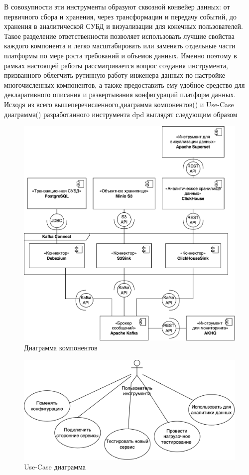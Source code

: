 В совокупности эти инструменты образуют сквозной конвейер данных: от первичного сбора и хранения, через трансформации и передачу событий, до хранения в аналитической СУБД и визуализации для конечных пользователей. Такое разделение ответственности позволяет использовать лучшие свойства каждого компонента и легко масштабировать или заменять отдельные части платформы по мере роста требований и объемов данных.
Именно поэтому в рамках настоящей работы рассматривается вопрос создания инструмента, призванного облегчить рутинную работу инженера данных по настройке многочисленных компонентов, а также предоставить ему удобное средство для декларативного описания и развертывания конфигураций платформ данных.
Исходя из всего вышеперечисленного,диаграмма компонентов() и Use-Case диаграмма() разработанного инструмента dpd выглядят следующим образом

\begin{figure}[h]
	\center
	\includegraphics [scale=0.3] {my_folder/images/diagram_components}
	\caption{Диаграмма компонентов}
	\label{fig:diagram_components}
\end{figure}
\FloatBarrier
\begin{figure}[h]
	\center
	\includegraphics [scale=0.4] {my_folder/images/diagram_usecase}
	\caption{Use-Case диаграмма}
	\label{fig:diagram_usecase}
\end{figure}
\FloatBarrier

